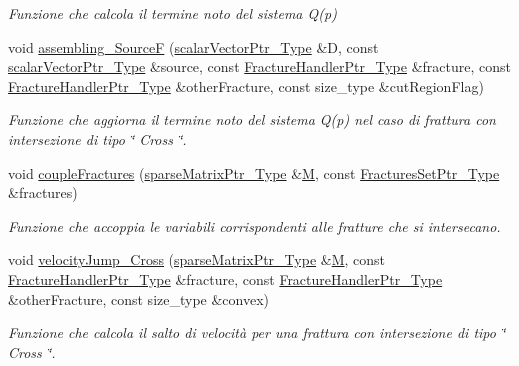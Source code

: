 \begin{DoxyCompactItemize}
\begin{DoxyCompactList}\small\item\em Funzione che calcola il termine noto del sistema Q(p) \end{DoxyCompactList}\item 
void \hyperlink{namespacegetfem_a5efeefe94dfb5427c3ecf63d0b342c57}{assembling\-\_\-\-Source\-F} (\hyperlink{Core_8h_ab09b6fa3c23db1b8c60456f8690c44a7}{scalar\-Vector\-Ptr\-\_\-\-Type} \&D, const \hyperlink{Core_8h_ab09b6fa3c23db1b8c60456f8690c44a7}{scalar\-Vector\-Ptr\-\_\-\-Type} \&source, const \hyperlink{FractureHandler_8h_af23fb7a30aaff864bd42587af4f1e78a}{Fracture\-Handler\-Ptr\-\_\-\-Type} \&fracture, const \hyperlink{FractureHandler_8h_af23fb7a30aaff864bd42587af4f1e78a}{Fracture\-Handler\-Ptr\-\_\-\-Type} \&other\-Fracture, const size\-\_\-type \&cut\-Region\-Flag)
\begin{DoxyCompactList}\small\item\em Funzione che aggiorna il termine noto del sistema Q(p) nel caso di frattura con intersezione di tipo \char`\"{} Cross \char`\"{}. \end{DoxyCompactList}\item 
void \hyperlink{namespacegetfem_a9a0b9f7498668cda8b547b10ac914a34}{couple\-Fractures} (\hyperlink{Core_8h_a87137a9501b38c724ac80bc955164bb7}{sparse\-Matrix\-Ptr\-\_\-\-Type} \&\hyperlink{matrici_8m_aa3fcd1f5ca38bf1f708720d0a9481e05}{M}, const \hyperlink{FracturesSet_8h_ac29a2a91d3af77fb459980a7db47f420}{Fractures\-Set\-Ptr\-\_\-\-Type} \&fractures)
\begin{DoxyCompactList}\small\item\em Funzione che accoppia le variabili corrispondenti alle fratture che si intersecano. \end{DoxyCompactList}\item 
void \hyperlink{namespacegetfem_acc74b86734c3814042e614d015f23876}{velocity\-Jump\-\_\-\-Cross} (\hyperlink{Core_8h_a87137a9501b38c724ac80bc955164bb7}{sparse\-Matrix\-Ptr\-\_\-\-Type} \&\hyperlink{matrici_8m_aa3fcd1f5ca38bf1f708720d0a9481e05}{M}, const \hyperlink{FractureHandler_8h_af23fb7a30aaff864bd42587af4f1e78a}{Fracture\-Handler\-Ptr\-\_\-\-Type} \&fracture, const \hyperlink{FractureHandler_8h_af23fb7a30aaff864bd42587af4f1e78a}{Fracture\-Handler\-Ptr\-\_\-\-Type} \&other\-Fracture, const size\-\_\-type \&convex)
\begin{DoxyCompactList}\small\item\em Funzione che calcola il salto di velocità per una frattura con intersezione di tipo \char`\"{} Cross \char`\"{}. \end{DoxyCompactList}\end{DoxyCompactItemize}


